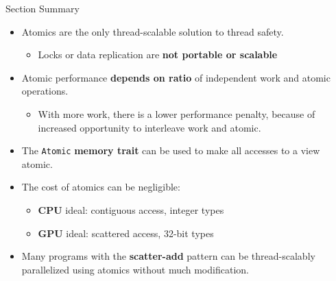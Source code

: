 \begin{frame}{Section Summary}

  \begin{itemize}
    \item Atomics are the only thread-scalable solution to thread safety.
      \begin{itemize}
        \item Locks or data replication are \textbf{not portable or scalable}
      \end{itemize}
    \item Atomic performance \textbf{depends on ratio} of independent work and atomic operations.
      \begin{itemize}
        \item With more work, there is a lower performance penalty, because of increased opportunity to interleave work and atomic.
      \end{itemize}
    \item The \texttt{Atomic} \textbf{memory trait} can be used to make all accesses to a view atomic.
    \item The cost of atomics can be negligible:
      \begin{itemize}
        \item \textbf{CPU} ideal: contiguous access, integer types
        \item \textbf{GPU} ideal: scattered access, 32-bit types
      \end{itemize}
    \item Many programs with the \textbf{scatter-add} pattern can be thread-scalably parallelized using atomics without much modification.
  \end{itemize}

\end{frame}
